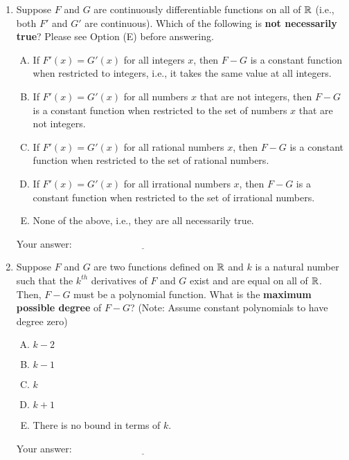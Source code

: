 \documentclass[10pt]{amsart}
\begin{document}
\begin{enumerate}

\item Suppose $F$ and $G$ are continuously differentiable functions on
  all of $\mathbb{R}$ (i.e., both $F'$ and $G'$ are continuous). Which of the
  following is {\bf not necessarily true}? Please see Option (E)
  before answering.

  \begin{enumerate}[(A)]
  \item If $F'(x) = G'(x)$ for all integers $x$, then $F - G$ is a
    constant function when restricted to integers, i.e., it takes the
    same value at all integers.
  \item If $F'(x) = G'(x)$ for all numbers $x$ that are not integers,
    then $F - G$ is a constant function when restricted to the set of
    numbers $x$ that are not integers.
  \item If $F'(x) = G'(x)$ for all rational numbers $x$, then $F - G$
    is a constant function when restricted to the set of rational
    numbers.
  \item If $F'(x) = G'(x)$ for all irrational numbers $x$, then $F -
    G$ is a constant function when restricted to the set of irrational
    numbers.
  \item None of the above, i.e., they are all necessarily true.
  \end{enumerate}

  \vspace{0.05in}
  Your answer: $\underline{\qquad\qquad\qquad\qquad\qquad\qquad\qquad}$
  \vspace{0.05in}

\item Suppose $F$ and $G$ are two functions defined on $\mathbb{R}$ and $k$ is
  a natural number such that the $k^{th}$ derivatives of $F$ and $G$
  exist and are equal on all of $\mathbb{R}$. Then, $F - G$ must be a
  polynomial function. What is the {\bf maximum possible degree} of $F
  - G$?  (Note: Assume constant polynomials to have degree zero)

  \begin{enumerate}[(A)]
  \item $k - 2$
  \item $k - 1$
  \item $k$
  \item $k + 1$
  \item There is no bound in terms of $k$.
  \end{enumerate}

  \vspace{0.05in}
  Your answer: $\underline{\qquad\qquad\qquad\qquad\qquad\qquad\qquad}$
  \vspace{0.05in}


\end{enumerate}
\end{document}
